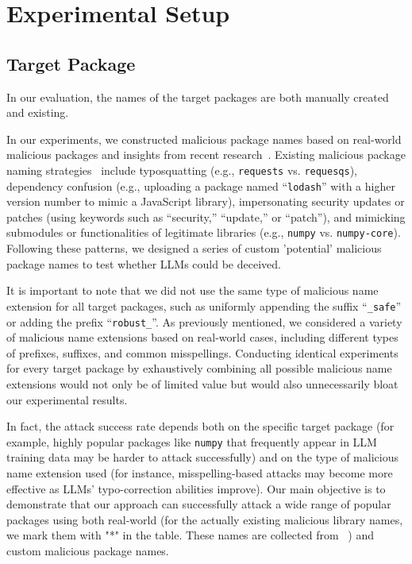 \section{Experimental Setup}\label{sec:setup}

\subsection{Target Package}\label{subsec:target_package}
In our evaluation, the names of the target packages are both manually created and existing. 

In our experiments, we constructed malicious package names based on real-world malicious packages and insights from recent research~\citep{software_supply_chain_sec_1,software_supply_chain_sec_2,software_supply_chain_sec_3}. Existing malicious package naming strategies~\citep{malicious_package_collection} include typosquatting (e.g., \texttt{requests} vs. \texttt{requesqs}), dependency confusion (e.g., uploading a package named “\texttt{lodash}” with a higher version number to mimic a JavaScript library), impersonating security updates or patches (using keywords such as “security,” “update,” or “patch”), and mimicking submodules or functionalities of legitimate libraries (e.g., \texttt{numpy} vs. \texttt{numpy-core}). Following these patterns, we designed a series of custom 'potential' malicious package names to test whether LLMs could be deceived.

It is important to note that we did not use the same type of malicious name extension for all target packages, such as uniformly appending the suffix “\texttt{\_safe}” or adding the prefix “\texttt{robust\_}”. As previously mentioned, we considered a variety of malicious name extensions based on real-world cases, including different types of prefixes, suffixes, and common misspellings. Conducting identical experiments for every target package by exhaustively combining all possible malicious name extensions would not only be of limited value but would also unnecessarily bloat our experimental results.

In fact, the attack success rate depends both on the specific target package (for example, highly popular packages like \texttt{numpy} that frequently appear in LLM training data may be harder to attack successfully) and on the type of malicious name extension used (for instance, misspelling-based attacks may become more effective as LLMs' typo-correction abilities improve). Our main objective is to demonstrate that our approach can successfully attack a wide range of popular packages using both real-world (for the actually existing malicious library names, we mark them with "*" in the table. These names are collected from ~\citep{malicious_package_collection}) and custom malicious package names.

